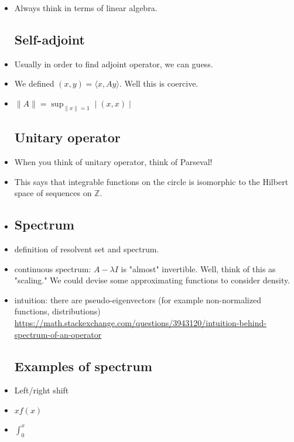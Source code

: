 \documentclass{article}
\theoremstyle{remark}
\begin{document}
\begin{itemize}
\item Always think in terms of linear algebra.

\subsection*{Self-adjoint}
\item Usually in order to find adjoint operator, we can guess.
\item We defined $(x,y)=\langle x,Ay\rangle$. Well this is coercive.
\item $\lVert A\rVert=\sup_{\lVert x\rVert=1}\mid(x,x)\mid$

\subsection*{Unitary operator}
\item When you think of unitary operator, think of Parseval!
\item This says that integrable functions on the circle is isomorphic to the Hilbert space of sequences on $\mathbb{Z}$.
\item 











\subsection*{Spectrum}
\item definition of resolvent set and spectrum.
\item continuous spectrum: $A-\lambda I$ is "almost" invertible. Well, think of this as "scaling." We could devise some approximating functions to consider density.
\item intuition: there are pseudo-eigenvectors (for example non-normalized functions, distributions)
\url{https://math.stackexchange.com/questions/3943120/intuition-behind-spectrum-of-an-operator}



\subsection*{Examples of spectrum}
\item Left/right shift
\item $xf(x)$
\item $\int_0^x $
















\end{itemize}
\end{document}

